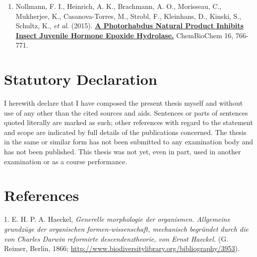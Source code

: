 \documentclass[11pt,singlespacinge,twoside]{reedthesis} %
\providecommand{\tightlist}{%
  \setlength{\itemsep}{0pt}\setlength{\parskip}{0pt}}
\begin{document}
 \hrulefill
\begin{enumerate}
\def\labelenumi{\arabic{enumi}.}
\tightlist
\item
  Nollmann, F. I., Heinrich, A. K., Brachmann, A. O., Morisseau, C., Mukherjee, K., Casanova-Torres, M., Strobl, F., Kleinhans, D., Kinski, S., Schultz, K., \emph{et al.} (2015). \href{https://onlinelibrary.wiley.com/doi/abs/10.1002/cbic.201402650}{\textbf{A Photorhabdus Natural Product Inhibits Insect Juvenile Hormone Epoxide Hydrolase.}} ChemBioChem 16, 766-771.
\end{enumerate}
\hypertarget{statutory-declaration}{%
\chapter*{\texorpdfstring{\textbf{Statutory Declaration}}{Statutory Declaration}}\label{statutory-declaration}}

I herewith declare that I have composed the present thesis myself and without use of any other than the
cited sources and aids. Sentences or parts of sentences quoted literally are marked as such; other references
with regard to the statement and scope are indicated by full details of the publications concerned. The thesis
in the same or similar form has not been submitted to any examination body and has not been published.
This thesis was not yet, even in part, used in another examination or as a course performance.

\vskip 2cm
\centerline{\makebox[6cm][c]{\hrulefill} \makebox[0.5cm][c]{} \makebox[6cm][c]{\hrulefill}}
\centerline{\makebox[0.5cm][c]{} }

\backmatter

\hypertarget{references}{%
\chapter*{References}\label{references}}


\noindent

\setlength{\parindent}{-0.20in}
\setlength{\leftskip}{0.20in}
\setlength{\parskip}{8pt}

\hypertarget{refs}{}
\leavevmode\hypertarget{ref-Haeckel1866}{}%
1. E. H. P. A. Haeckel, \emph{Generelle morphologie der organismen. Allgemeine grundzüge der organischen formen-wissenschaft, mechanisch begründet durch die von Charles Darwin reformirte descendenztheorie, von Ernst Haeckel.} (G. Reimer, Berlin, 1866; \url{http://www.biodiversitylibrary.org/bibliography/3953}).
\end{document}
